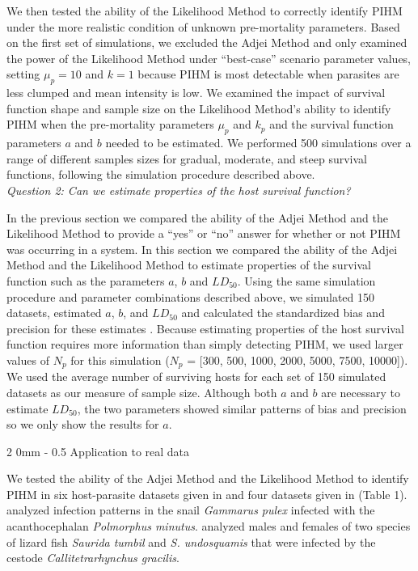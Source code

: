 \documentclass[12pt, a4paper]{article}
\makeatletter
\renewcommand{\subsection}{\@startsection
{subsection}%
{2}%
{0mm}%
{-\baselineskip}%
{0.5\baselineskip}%
{\normalfont\bf}} %
\makeatother
\begin{document}
We then tested the ability of the Likelihood Method to correctly identify PIHM
under the more realistic condition of unknown pre-mortality parameters. Based
on the first set of simulations, we excluded the Adjei Method and only examined
the power of the Likelihood Method under ``best-case'' scenario parameter
values, setting $\mu_p = 10$ and $k = 1$ because PIHM is most detectable when
parasites are less clumped and mean intensity is low. We examined the impact of survival function shape and
sample size on the Likelihood Method's ability to identify PIHM when the pre-mortality parameters $\mu_p$ and $k_p$ and the survival function parameters $a$
and $b$ needed to be estimated.  We performed 500 simulations over a range of
different samples sizes for gradual, moderate, and steep survival functions, following the simulation procedure described above. \\

\noindent
\emph{Question 2: Can we estimate properties of the host survival function?}

In the previous section we compared the ability of the Adjei Method and the Likelihood Method to provide a ``yes'' or ``no'' answer for whether or not PIHM was occurring in a system. In this section we compared the ability of the Adjei Method and the Likelihood Method to estimate properties of the survival function such as the parameters $a$, $b$ and $LD_{50}$.  Using the same simulation procedure and parameter combinations described above, we simulated 150 datasets, estimated $a$, $b$, and $LD_{50}$ and calculated the standardized bias and
precision for these estimates \citep{Walther2005}.  Because estimating properties of the host survival function requires more information than simply detecting PIHM, we used larger values of $N_p$ for this simulation ($N_p$ = [300, 500, 1000, 2000, 5000, 7500,
10000]).  We used the average number of surviving hosts for each set of 150 simulated datasets as our measure of sample size.  Although both $a$ and $b$ are necessary to estimate $LD_{50}$, the two parameters showed similar patterns of bias and precision so we only show the results for $a$.

\subsection{Application to real data}

We tested the ability of the Adjei Method and the Likelihood Method to identify
PIHM in six host-parasite datasets given in \cite{Crofton1971a} and four datasets
given in \cite{Adjei1986} (Table 1). \citeauthor{Crofton1971a} analyzed infection patterns in the snail \emph{Gammarus pulex} infected with the
acanthocephalan \emph{Polmorphus minutus}. \citeauthor{Adjei1986} analyzed males and females of two species of lizard fish \emph{Saurida tumbil} and
\emph{S. undosquamis} that were infected by the cestode
\emph{Callitetrarhynchus gracilis}.
\end{document}
